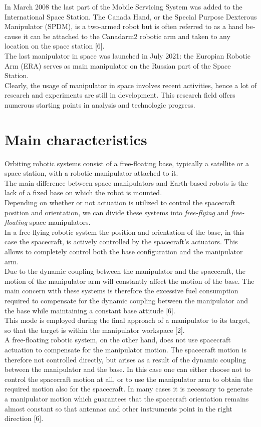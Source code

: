 \documentclass[a4paper,12pt,oneside]{report}
\begin{document}
In March 2008 the last part of the Mobile Servicing System was added to the International Space Station. The Canada Hand, or the Special Purpose Dexterous Manipulator (SPDM), is a two-armed robot but is often referred to as a hand be- cause it can be attached to the Canadarm2 robotic arm and taken to any location on the space station [6].\\
The last manipulator in space was launched in July 2021: the Europian Robotic Arm (ERA) serves as main manipulator on the Russian part of the Space Station.\\
Clearly, the usage of manipulator in space involves recent activities, hence a lot of research and experiments are still in development. This research field offers numerous starting points in analysis and technologic progress.
\section{Main characteristics}
Orbiting robotic systems consist of a free-floating base, typically a satellite or a space station, with a robotic manipulator attached to it.\\
The main difference between space manipulators and Earth-based robots is the lack of a fixed base on which the robot is mounted.\\
Depending on whether or not actuation is utilized to control the spacecraft position and orientation, we can divide these systems into \textit{free-flying} and \textit{free-floating} space manipulators. \\
In a free-flying robotic system the position and orientation of the base, in this case the spacecraft, is actively controlled by the spacecraft’s actuators. This allows to completely control both the base configuration and the manipulator arm.\\ 
Due to the dynamic coupling between the manipulator and the spacecraft, the motion of the manipulator arm will constantly affect the motion of the base. The main concern with these systems is therefore the excessive fuel consumption required to compensate for the dynamic coupling between the manipulator and the base while maintaining a constant base attitude [6].\\
This mode is employed during the final approach of a manipulator to its target, so that the target is within the manipulator workspace [2].\\
A free-floating robotic system, on the other hand, does not use spacecraft actuation to compensate for the manipulator motion. The spacecraft motion is therefore not controlled directly, but arises as a result of the dynamic coupling between the manipulator and the base. In this case one can either choose not to control the spacecraft motion at all, or to use the manipulator arm to obtain the required motion also for the spacecraft. In many cases it is necessary to generate a manipulator motion which guarantees that the spacecraft orientation remains almost constant so that antennas and other instruments point in the right direction [6].\\
\end{document}
